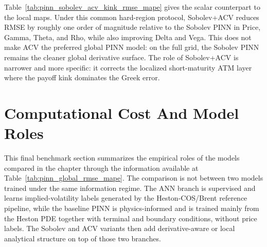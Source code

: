 Table~\ref{tab:pinn_sobolev_acv_kink_rmse_mape} gives the scalar counterpart to the local maps. Under this common hard-region protocol, Sobolev+ACV reduces RMSE by roughly one order of magnitude relative to the Sobolev PINN in Price, Gamma, Theta, and Rho, while also improving Delta and Vega. This does not make ACV the preferred global PINN model: on the full grid, the Sobolev PINN remains the cleaner global derivative surface. The role of Sobolev+ACV is narrower and more specific: it corrects the localized short-maturity ATM layer where the payoff kink dominates the Greek error.

\section{Computational Cost And Model Roles}
\label{sec:cross_model_computational_comparison}
This final benchmark section summarizes the empirical roles of the models compared in the chapter through the information available at Table~\ref{tab:pinn_global_rmse_mape}. 
The comparison is not between two models trained under the same information regime. 
The ANN branch is supervised and learns implied-volatility labels generated by the Heston-COS/Brent reference pipeline, while the baseline PINN is physics-informed and is trained mainly from the Heston PDE together with terminal and boundary conditions, without price labels. 
The Sobolev and ACV variants then add derivative-aware or local analytical structure on top of those two branches. 

